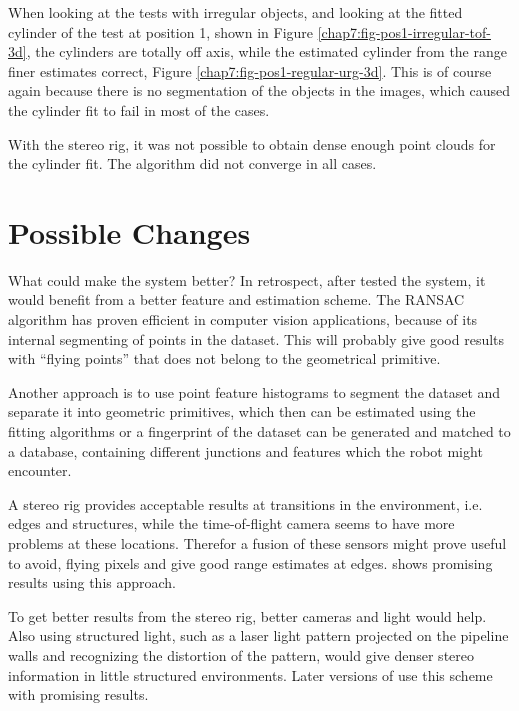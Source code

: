 When looking at the tests with irregular objects, and looking at the fitted cylinder of
the test at position 1, shown in Figure \ref{chap7:fig-pos1-irregular-tof-3d}, the
cylinders are totally off axis, while the estimated cylinder from the range finer
estimates correct, Figure \ref{chap7:fig-pos1-regular-urg-3d}. This is of course again
because there is no segmentation of the objects in the images, which caused the cylinder
fit to fail in most of the cases. 

With the stereo rig, it was not possible to obtain dense enough point clouds for the
cylinder fit. The algorithm did not converge in all cases. 

\section{Possible Changes}
What could make the system better? In retrospect, after tested the system, it would
benefit from a better feature and estimation scheme. The RANSAC algorithm has proven
efficient in computer vision applications, because of its internal segmenting of points in 
the dataset. This will probably give good results with ``flying points'' that does not
belong to the geometrical primitive. 

Another approach is to use point feature histograms to segment the dataset and separate it
into geometric primitives, which then can be estimated using the fitting algorithms or a
fingerprint of the dataset can be generated and matched to a database, containing
different junctions and features which the robot might encounter. 

A stereo rig provides acceptable results at transitions in the environment, i.e. edges and
structures, while the time-of-flight camera seems to have more problems at these locations.
Therefor a fusion of these sensors might prove useful to avoid, flying pixels and give good
range estimates at edges. \cite{tof-stereo-fusion} shows promising results using this
approach. 

To get better results from the stereo rig, better cameras and light would help. Also using
structured light, such as a laser light pattern projected on the pipeline walls and
recognizing the distortion of the pattern, would give denser stereo information in little
structured environments. Later versions of \cite{makro-plus} use this scheme with promising
results. 


